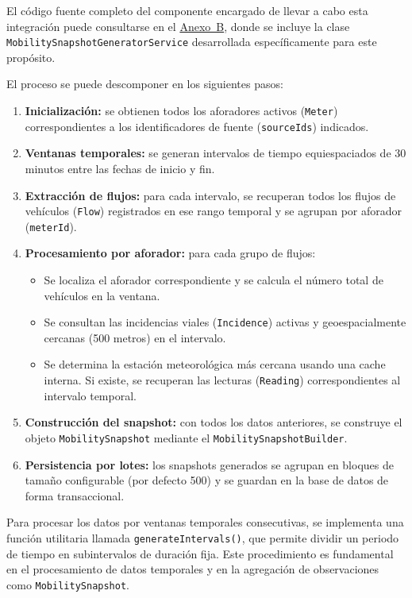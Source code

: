 El código fuente completo del componente encargado de llevar a cabo esta integración puede consultarse en el \hyperref[anexo:snapshot_generator]{Anexo~B}, donde se incluye la clase \texttt{MobilitySnapshotGeneratorService} desarrollada específicamente para este propósito.

El proceso se puede descomponer en los siguientes pasos:

\begin{enumerate}
	\item \textbf{Inicialización:} se obtienen todos los aforadores activos (\texttt{Meter}) correspondientes a los identificadores de fuente (\texttt{sourceIds}) indicados.
	\item \textbf{Ventanas temporales:} se generan intervalos de tiempo equiespaciados de 30 minutos entre las fechas de inicio y fin.
	\item \textbf{Extracción de flujos:} para cada intervalo, se recuperan todos los flujos de vehículos (\texttt{Flow}) registrados en ese rango temporal y se agrupan por aforador (\texttt{meterId}).
	\item \textbf{Procesamiento por aforador:} para cada grupo de flujos:
	\begin{itemize}
		\item Se localiza el aforador correspondiente y se calcula el número total de vehículos en la ventana.
		\item Se consultan las incidencias viales (\texttt{Incidence}) activas y geoespacialmente cercanas (500 metros) en el intervalo.
		\item Se determina la estación meteorológica más cercana usando una cache interna. Si existe, se recuperan las lecturas (\texttt{Reading}) correspondientes al intervalo temporal.
	\end{itemize}
	\item \textbf{Construcción del snapshot:} con todos los datos anteriores, se construye el objeto \texttt{MobilitySnapshot} mediante el \texttt{MobilitySnapshotBuilder}.
	\item \textbf{Persistencia por lotes:} los snapshots generados se agrupan en bloques de tamaño configurable (por defecto 500) y se guardan en la base de datos de forma transaccional.
\end{enumerate}

Para procesar los datos por ventanas temporales consecutivas, se implementa una función utilitaria llamada \texttt{generateIntervals()}, que permite dividir un periodo de tiempo en subintervalos de duración fija. Este procedimiento es fundamental en el procesamiento de datos temporales y en la agregación de observaciones como \texttt{MobilitySnapshot}.

